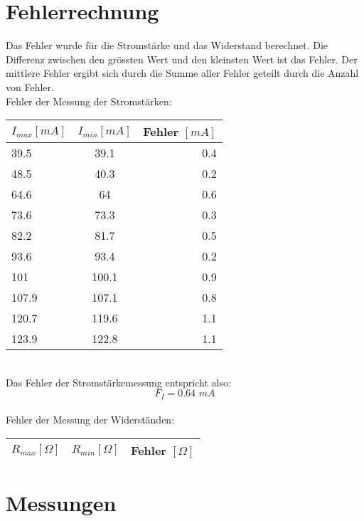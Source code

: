 \documentclass[12pt, a4paper, twoside]{article}
\begin{document}
    \section{Fehlerrechnung}
    Das Fehler wurde für die Stromstärke und das Widerstand berechnet. Die Differenz zwischen den grössten Wert und den kleinsten Wert ist das Fehler. Der mittlere Fehler ergibt sich durch die Summe aller Fehler geteilt durch die Anzahl von Fehler.
    \vspace{1cm}\\
    Fehler der Messung der Stromstärken:
    \vspace{1cm}\\
        \begin{tabular}{l|c|r}
            $I_{max} [mA]$ & $I_{min} [mA]$ &Fehler $[mA]$\\
            \hline
            39.5   & 39.1   &  0.4  \\
            48.5   & 40.3   & 0.2  \\
            64.6   & 64   & 0.6  \\
            73.6   & 73.3   & 0.3  \\
            82.2   & 81.7   & 0.5  \\
            93.6   & 93.4   & 0.2  \\
            101   & 100.1   & 0.9  \\
            107.9 & 107.1 & 0.8 \\
            120.7   & 119.6   & 1.1  \\
            123.9   & 122.8   & 1.1  
        \end{tabular}
        \vspace{1cm}\\
        Das Fehler der Stromstärkemessung entspricht also:
        \[F_I = 0.64 \hspace{4pt} mA\]
        \vspace{1cm}\\
        Fehler der Messung der Widerständen:
        \vspace{1cm}\\
        \begin{tabular}{l|c|r}
            $R_{max} [\Omega]$ & $R_{min} [\Omega]$ & Fehler $[\Omega]$\\
            \hline
            
            
        \end{tabular}

    \newpage
    \section{Messungen}     
\end{document}
